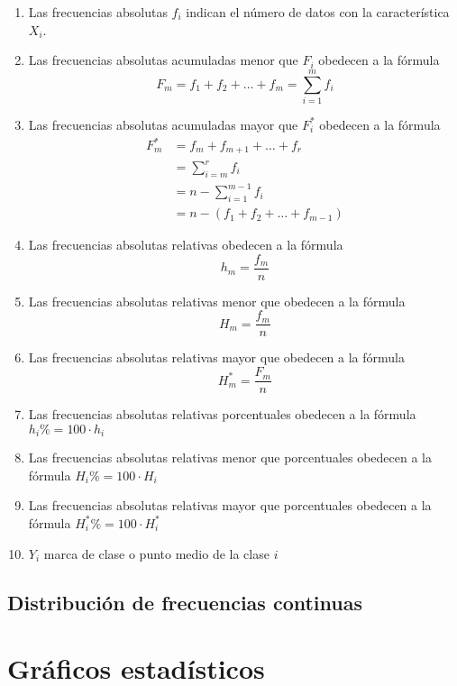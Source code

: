 \documentclass[a4paper]{report}
\begin{document}
\begin{enumerate}
	\item  Las frecuencias absolutas $f_i$ indican el número de datos con la característica $X_i$.
	\item   Las frecuencias absolutas acumuladas menor que $F_i$ obedecen a la fórmula $$F_m=f_1+f_2+\ldots+f_m=\sum_{i=1}^mf_i$$
	\item   Las frecuencias absolutas acumuladas mayor que $F_i^*$ obedecen a la fórmula
	      $$
		      \begin{aligned}
			      F_m^* & =f_m+f_{m+1}+\ldots+f_r                  \\
			            & =\sum_{i=m}^rf_i                         \\
			            & =n-\sum_{i=1}^{m-1}f_i                   \\
			            & =n-\left(f_1+f_{2}+\ldots+f_{m-1}\right)
		      \end{aligned}
	      $$
	\item   Las frecuencias absolutas relativas obedecen a la fórmula $$h_m=\frac{f_m}{n}$$
	\item   Las frecuencias absolutas relativas menor que obedecen a la fórmula $$H_m=\frac{f_m}{n}$$
	\item   Las frecuencias absolutas relativas mayor que obedecen a la fórmula $$H_m^*=\frac{F_m}{n}$$
	\item   Las frecuencias absolutas relativas porcentuales obedecen a la fórmula $h_i\%=100\cdot h_i$
	\item  Las frecuencias absolutas relativas menor que porcentuales obedecen a la fórmula $H_i\%=100\cdot H_i$
	\item   Las frecuencias absolutas relativas mayor que porcentuales obedecen a la fórmula $H_i^*\%=100\cdot H_i^*$
	\item  $Y_i$ marca de clase o punto medio de la clase $i$
\end{enumerate}


\subsection{Distribución de frecuencias continuas}


\section{Gráficos estadísticos}
\end{document}

